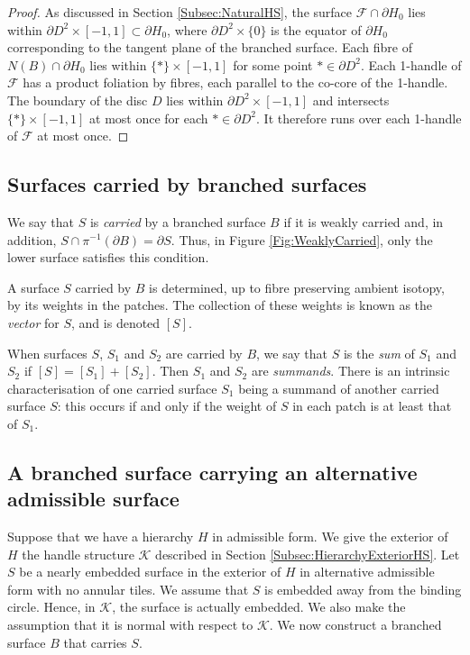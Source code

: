 \documentclass[oneside]{amsart}
\numberwithin{equation}{section}
\theoremstyle{plain}
\theoremstyle{definition}
\begin{document}
\begin{proof} As discussed in Section \ref{Subsec:NaturalHS}, the surface $\mathcal{F} \cap \partial H_0$ lies
within $\partial D^2 \times [-1, 1] \subset \partial H_0$, where $\partial D^2 \times \{ 0 \}$ is
the equator of $\partial H_0$ corresponding to the tangent plane of the branched surface.
Each fibre of $N(B) \cap \partial H_0$ lies within $\{ \ast \} \times [-1, 1]$ for
some point $\ast \in \partial D^2$. Each 1-handle of $\mathcal{F}$ has a product foliation by fibres,
each parallel to the co-core of the 1-handle. The boundary of the disc $D$
lies within $\partial D^2 \times [-1, 1]$ and intersects $\{ \ast \} \times [-1, 1]$
at most once for each $\ast \in \partial D^2$. It therefore runs over each 1-handle of $\mathcal{F}$ at most once.
\end{proof}

\subsection{Surfaces carried by branched surfaces}

We say that $S$ is \emph{carried} by a branched surface $B$ if it is weakly carried and, in addition, $S \cap \pi^{-1}(\partial B) = \partial S$.
Thus, in Figure \ref{Fig:WeaklyCarried}, only the lower surface satisfies this condition.

A surface $S$ carried by $B$ is determined, up to fibre preserving ambient isotopy, by its weights in the patches. The collection
of these weights is known as the \emph{vector} for $S$, and is denoted $[S]$.

When surfaces $S$, $S_1$ and $S_2$ are carried by $B$, we say that
$S$ is the \emph{sum} of $S_1$ and $S_2$ if $[S] = [S_1] + [S_2]$.
Then $S_1$ and $S_2$ are \emph{summands}. There is an intrinsic characterisation
of one carried surface $S_1$ being a summand of another carried surface $S$: this occurs
if and only if the weight of $S$ in each patch is at least that of $S_1$.

\subsection{A branched surface carrying an alternative admissible surface}
\label{Subsec:BranchedSurfaceCarryingAdmissible}

Suppose that we have a hierarchy $H$ in admissible form. We give the exterior of $H$ the handle structure $\mathcal{K}$ described in Section \ref{Subsec:HierarchyExteriorHS}. Let $S$ be a nearly embedded surface
in the exterior of $H$ in alternative admissible form with no annular tiles. We assume
that $S$ is embedded away from the binding circle. Hence, in $\mathcal{K}$,
the surface is actually embedded. We also make the assumption that it is normal with respect to $\mathcal{K}$.
We now construct a branched surface $B$ that carries $S$. 
\end{document}
